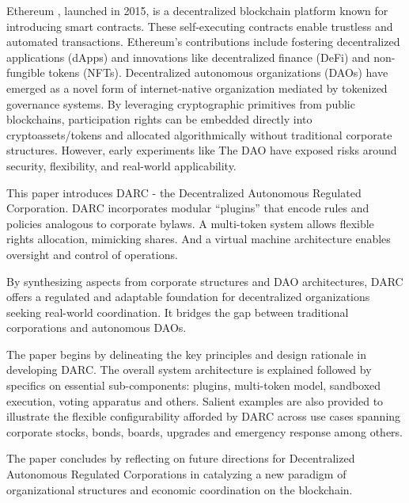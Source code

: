 \documentclass{article}
\begin{document}
Ethereum \cite{buterin2013ethereum}, launched in 2015, is a decentralized blockchain platform known for introducing smart contracts. These self-executing contracts enable trustless and automated transactions. Ethereum's contributions include fostering decentralized applications (dApps) and innovations like decentralized finance (DeFi) and non-fungible tokens (NFTs). Decentralized autonomous organizations (DAOs)\cite{jentzsch2016decentralized} have emerged as a novel form of internet-native organization mediated by tokenized governance systems. By leveraging cryptographic primitives from public blockchains, participation rights can be embedded directly into cryptoassets/tokens and allocated algorithmically without traditional corporate structures. However, early experiments like The DAO have exposed risks around security, flexibility, and real-world applicability.

This paper introduces DARC - the Decentralized Autonomous Regulated Corporation. DARC incorporates modular ``plugins'' that encode rules and policies analogous to corporate bylaws. A multi-token system allows flexible rights allocation, mimicking shares. And a virtual machine architecture enables oversight and control of operations.

By synthesizing aspects from corporate structures and DAO architectures, DARC offers a regulated and adaptable foundation for decentralized organizations seeking real-world coordination. It bridges the gap between traditional corporations and autonomous DAOs.

The paper begins by delineating the key principles and design rationale in developing DARC. The overall system architecture is explained followed by specifics on essential sub-components: plugins, multi-token model, sandboxed execution, voting apparatus and others. Salient examples are also provided to illustrate the flexible configurability afforded by DARC across use cases spanning corporate stocks, bonds, boards, upgrades and emergency response among others.

The paper concludes by reflecting on future directions for Decentralized Autonomous Regulated Corporations in catalyzing a new paradigm of organizational structures and economic coordination on the blockchain.







































\end{document}
